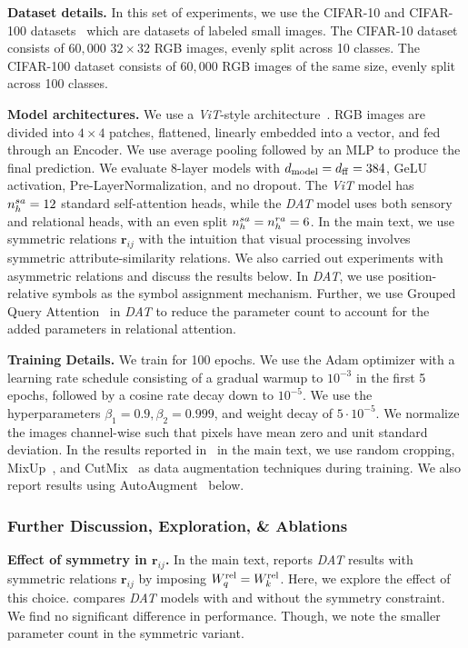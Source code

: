 \textbf{Dataset details.} In this set of experiments, we use the CIFAR-10 and CIFAR-100 datasets~\citep{cifar_dataset} which are datasets of labeled small images. The CIFAR-10 dataset consists of $60,000$ $32 \times 32$ RGB images, evenly split across 10 classes. The CIFAR-100 dataset consists of $60,000$ RGB images of the same size, evenly split across 100 classes.

\textbf{Model architectures.} We use a \textit{ViT}-style architecture~\citep{dosovitskiyImageWorth16x162020}. RGB images are divided into $4 \times 4$ patches, flattened, linearly embedded into a vector, and fed through an Encoder. We use average pooling followed by an MLP to produce the final prediction. We evaluate 8-layer models with $d_{\mathrm{model}} = d_{\mathrm{ff}} = 384$, GeLU activation, Pre-LayerNormalization, and no dropout. The \textit{ViT} model has $n_h^{sa} = 12$ standard self-attention heads, while the \textit{DAT} model uses both sensory and relational heads, with an even split $n_h^{sa} = n_h^{ra} = 6$. In the main text, we use symmetric relations $\bm{r}_{ij}$ with the intuition that visual processing involves symmetric attribute-similarity relations. We also carried out experiments with asymmetric relations and discuss the results below. In \textit{DAT}, we use position-relative symbols as the symbol assignment mechanism. Further, we use Grouped Query Attention~\citep{ainslie-etal-2023-gqa} in \textit{DAT} to reduce the parameter count to account for the added parameters in relational attention.

\textbf{Training Details.} We train for 100 epochs. We use the Adam optimizer with a learning rate schedule consisting of a gradual warmup to $10^{-3}$ in the first 5 epochs, followed by a cosine rate decay down to $10^{-5}$. We use the hyperparameters $\beta_1 = 0.9, \beta_2 = 0.999$, and weight decay of $5 \cdot 10^{-5}$. We normalize the images channel-wise such that pixels have mean zero and unit standard deviation. In the results reported in~ in the main text, we use random cropping, MixUp~\citep{zhang2018mixup}, and CutMix~\citep{yun2019cutmix} as data augmentation techniques during training. We also report results using AutoAugment~\citep{cubuk2019autoaugmentlearningaugmentationpolicies} below.

\subsubsection*{Further Discussion, Exploration, \& Ablations}

\textbf{Effect of symmetry in $\bm{r}_{ij}$.} In the main text,  reports \textit{DAT} results with symmetric relations $\bm{r}_{ij}$ by imposing $W_q^{\mathrm{rel}} = W_k^{\mathrm{rel}}$. Here, we explore the effect of this choice.  compares \textit{DAT} models with and without the symmetry constraint. We find no significant difference in performance. Though, we note the smaller parameter count in the symmetric variant.

